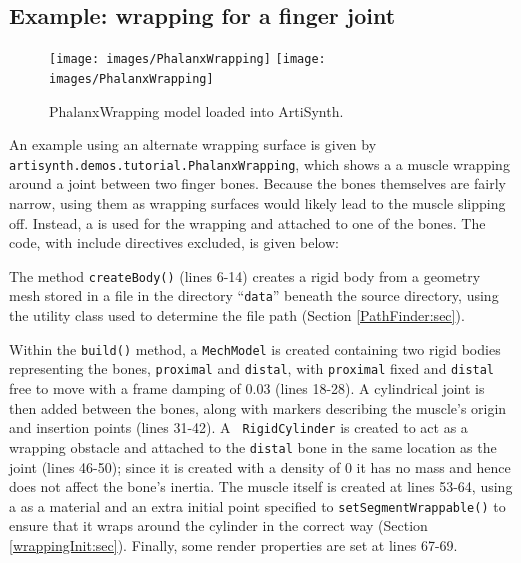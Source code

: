 \subsection{Example: wrapping for a finger joint}
\label{PhalanxWrapping:sec}

\begin{figure}[t]
\begin{center}
\iflatexml
 \texttt{[image: images/PhalanxWrapping]}
\else
 \texttt{[image: images/PhalanxWrapping]}
\fi
\end{center}
\caption{PhalanxWrapping model loaded into ArtiSynth.}
\label{PhalanxWrapping:fig}
\end{figure}

An example using an alternate wrapping surface is given by {\tt
artisynth.demos.tutorial.PhalanxWrapping}, which shows a 
a muscle wrapping around a joint between two finger
bones. Because the bones themselves are fairly narrow, using them as
wrapping surfaces would likely lead to the muscle slipping
off. Instead, a  is used for the
wrapping and attached to one of the bones. The code, with include
directives excluded, is given below: \lstset{numbers=left} \iflatexml

\else

\fi
\lstset{numbers=none}

The method {\tt createBody()} (lines 6-14) creates a rigid body from a
geometry mesh stored in a file in the directory ``{\tt data}'' beneath
the source directory, using the utility class
 used to determine the file path
(Section \ref{PathFinder:sec}).

Within the {\tt build()} method, a {\tt MechModel} is created
containing two rigid bodies representing the bones, {\tt proximal} and
{\tt distal}, with {\tt proximal} fixed and {\tt distal} free to move
with a frame damping of 0.03 (lines 18-28). A cylindrical joint is
then added between the bones, along with markers describing the
muscle's origin and insertion points (lines 31-42).  A {\tt
RigidCylinder} is created to act as a wrapping obstacle and attached
to the {\tt distal} bone in the same location as the joint (lines
46-50); since it is created with a density of 0 it has no mass and
hence does not affect the bone's inertia. The muscle itself is created
at lines 53-64, using a
 as a material
and an extra initial point specified to
{\tt setSegmentWrappable()} to ensure that it wraps around
the cylinder in the correct way (Section
\ref{wrappingInit:sec}). Finally, some render properties are set at lines
67-69.

